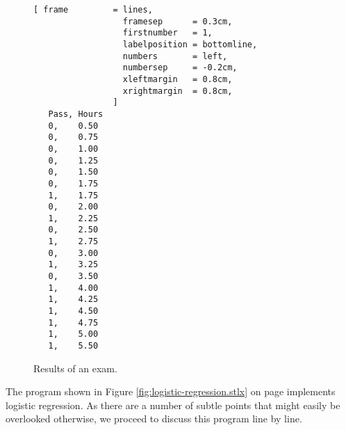 \begin{figure}[!ht]
\centering
\begin{Verbatim}[ frame         = lines, 
                  framesep      = 0.3cm, 
                  firstnumber   = 1,
                  labelposition = bottomline,
                  numbers       = left,
                  numbersep     = -0.2cm,
                  xleftmargin   = 0.8cm,
                  xrightmargin  = 0.8cm,
                ]
   Pass, Hours
   0,    0.50
   0,    0.75
   0,    1.00
   0,    1.25
   0,    1.50
   0,    1.75
   1,    1.75
   0,    2.00
   1,    2.25
   0,    2.50
   1,    2.75
   0,    3.00
   1,    3.25
   0,    3.50
   1,    4.00
   1,    4.25
   1,    4.50
   1,    4.75
   1,    5.00
   1,    5.50
\end{Verbatim}
\vspace*{-0.3cm}
\caption{Results of an exam.}
\label{fig:exam.csv}
\end{figure}

The program shown in Figure \ref{fig:logistic-regression.stlx} on page
\pageref{fig:logistic-regression.stlx} implements logistic regression.  As there are a number of
subtle points that might easily be overlooked otherwise, we proceed to discuss this program line by line. 


